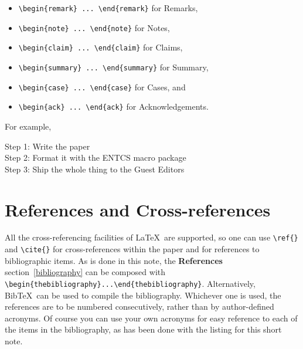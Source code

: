 \documentclass{entcs} \usepackage{entcsmacro}
\begin{document}
\begin{itemize}
\item \verb+\begin{remark} ... \end{remark}+ for Remarks,
\item \verb+\begin{note} ... \end{note}+ for Notes,
\item \verb+\begin{claim} ... \end{claim}+ for Claims,
\item \verb+\begin{summary} ... \end{summary}+ for Summary,
\item \verb+\begin{case} ... \end{case}+ for Cases, and
\item \verb+\begin{ack} ... \end{ack}+ for Acknowledgements.
\end{itemize}

For example,

\begin{algorithm}[h]
\begin{alg}
  Step 1:  Write the paper\\
  Step 2: Format it with the ENTCS macro package\\
  Step 3:  Ship the whole thing to the Guest Editors\\
\end{alg}
\end{algorithm}

\section{References and Cross-references}
All the cross-referencing facilities of \LaTeX\ are supported, so one
can use \verb+\ref{}+ and \verb+\cite{}+ for cross-references within
the paper and for references to bibliographic items.  As is done in
this note, the \textbf{References} section~\ref{bibliography} can be
composed with \verb+\begin{thebibliography}...\end{thebibliography}+.
Alternatively, Bib\TeX\ can be used to compile the bibliography.
Whichever one is used, the references are to be numbered
consecutively, rather than by author-defined acronyms.  Of course you
can use your own acronyms for easy reference to each of the items in
the bibliography, as has been done with the listing for this short
note.
\end{document}
